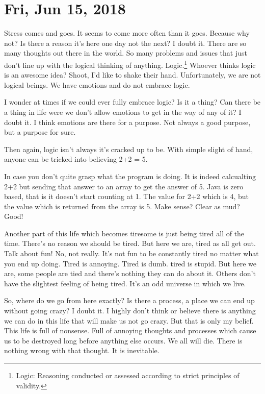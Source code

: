 \section{Fri, Jun 15, 2018}

Stress comes and goes. It seems to come more often than it goes. Because why
not? Is there a reason it's here one day not the next? I doubt it. There are so
many thoughts out there in the world. So many problems and issues that just
don't line up with the logical thinking of anything. Logic.\footnote{Logic:
Reasoning conducted or assessed according to strict principles of validity.} 
Whoever thinks logic is an awesome idea? Shoot, I'd like to shake their hand. 
Unfortunately, we are not logical beings. We have emotions and do not embrace 
logic.

I wonder at times if we could ever fully embrace logic? Is it a thing? Can there
be a thing in life were we don't allow emotions to get in the way of any of it?
I doubt it. I think emotions are there for a purpose. Not always a good purpose,
but a purpose for sure.

Then again, logic isn't always it's cracked up to be. With simple slight of
hand, anyone can be tricked into believing 2+2 = 5.



In case you don't quite grasp what the program is doing. It is indeed
calcualting 2+2 but sending that answer to an array to get the answer of 5. Java
is zero based, that is it doesn't start counting at 1. The value for 2+2 which
is 4, but the value which is returned from the array is 5. Make sense? Clear as
mud? Good!

Another part of this life which becomes tiresome is just being tired all of the
time. There's no reason we should be tired. But here we are, tired as all get
out. Talk about fun! No, not really. It's not fun to be constantly tired no
matter what you end up doing. Tired is annoying. Tired is dumb. tired is stupid.
But here we are, some people are tied and there's nothing they can do about it.
Others don't have the slightest feeling of being tired. It's an odd universe in
which we live.

So, where do we go from here exactly? Is there a process, a place we can end up
without going crazy? I doubt it. I highly don't think or believe there is
anything we can do in this life that will make us not go crazy. But that is only
my belief. This life is full of nonsense. Full of annoying thoughts and
processes which cause us to be destroyed long before anything else occurs. We
all will die. There is nothing wrong with that thought. It is inevitable.

